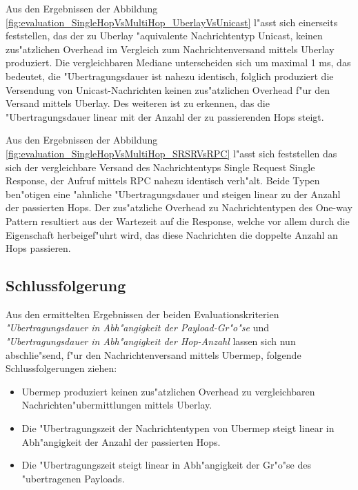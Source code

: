 Aus den Ergebnissen der Abbildung \ref{fig:evaluation_SingleHopVsMultiHop_UberlayVsUnicast} l"asst sich einerseits feststellen, das der zu Uberlay "aquivalente Nachrichtentyp Unicast, keinen zus"atzlichen Overhead im Vergleich zum Nachrichtenversand mittels Uberlay produziert. Die vergleichbaren Mediane unterscheiden sich um maximal 1 ms, das bedeutet, die "Ubertragungsdauer ist nahezu identisch, folglich produziert die Versendung von Unicast-Nachrichten keinen zus"atzlichen Overhead f"ur den Versand mittels Uberlay. Des weiteren ist zu erkennen, das die "Ubertragungsdauer linear mit der Anzahl der zu passierenden Hops steigt.

Aus den Ergebnissen der Abbildung \ref{fig:evaluation_SingleHopVsMultiHop_SRSRVsRPC} l"asst sich feststellen das sich der vergleichbare Versand des Nachrichtentyps Single Request Single Response, der Aufruf mittels RPC nahezu identisch verh"alt. Beide Typen ben"otigen eine "ahnliche "Ubertragungsdauer und steigen linear zu der Anzahl der passierten Hops. Der zus"atzliche Overhead zu Nachrichtentypen des One-way Pattern resultiert aus der Wartezeit auf die Response, welche vor allem durch die Eigenschaft herbeigef"uhrt wird, das diese Nachrichten die doppelte Anzahl an Hops passieren.

\subsection{Schlussfolgerung}

Aus den ermittelten Ergebnissen der beiden Evaluationskriterien \emph{"Ubertragungsdauer in Abh"angigkeit der Payload-Gr"o"se} und \emph{"Ubertragungsdauer in Abh"angigkeit der Hop-Anzahl} lassen sich nun abschlie"send, f"ur den Nachrichtenversand mittels Ubermep, folgende Schlussfolgerungen ziehen:

\begin{itemize}
\item Ubermep produziert keinen zus"atzlichen Overhead zu vergleichbaren Nachrichten"ubermittlungen mittels Uberlay.
\item Die "Ubertragungszeit der Nachrichtentypen von Ubermep steigt linear in Abh"angigkeit der Anzahl der passierten Hops.
\item Die "Ubertragungszeit steigt linear in Abh"angigkeit der Gr"o"se des "ubertragenen Payloads.
\end{itemize}

